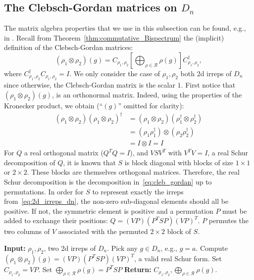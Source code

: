 \documentclass{article}
\theoremstyle{plain}
\theoremstyle{definition}
\theoremstyle{remark}
\begin{document}
\subsection{The Clebsch-Gordan matrices on $D_n$}\label{app:clebsch_gordan}
The matrix algebra properties that we use in this subsection can be found, e.g., in \citep{bhatia97}. Recall from Theorem~\ref{thm:commutative_Bispectrum} the (implicit) definition of the Clebsch-Gordan matrices:
\begin{equation}\label{eq:cleb_gordan}
    (\rho_1\otimes\rho_2)(g) = C_{\rho_1,\rho_2}\left[ \bigoplus_{\rho\in\mathcal{R}} \rho(g) \right]C_{\rho_1,\rho_2}^\dagger,
\end{equation}
where $C_{\rho_1,\rho_2}^\dagger C_{\rho_1,\rho_2}=I$.
We only consider the case of $\rho_1,\rho_2$ both 2d irreps of $D_n$ since otherwise, the Clebsch-Gordan matrix is the scalar $1$.
First notice that $(\rho_1\otimes\rho_2)(g)$, is an orthonormal matrix. Indeed, using the properties of the Kronecker product, we obtain (``$(g)$'' omitted for clarity):
\begin{align*}
    (\rho_1\otimes\rho_2)(\rho_1\otimes\rho_2)^\dagger &= (\rho_1\otimes\rho_2)(\rho_1^\dagger\otimes\rho_2^\dagger)\\
    &=(\rho_1\rho_1^\dagger)\otimes (\rho_2\rho_2^\dagger)\\
    &=I \otimes I = I
\end{align*}
For $Q$ a real orthogonal matrix ($Q^T Q = I$), and $VSV^T$ with $V^T V = I$, a real Schur decomposition of $Q$, it is known that $S$ is block diagonal with blocks of size $1\times 1$ or $2\times 2$. These blocks are themselves orthogonal matrices. Therefore, the real Schur decomposition is the decomposition in~\eqref{eq:cleb_gordan} up to permutations. In order for $S$ to represent exactly the irreps from~\eqref{eq:2d_irreps_dn}, the non-zero sub-diagonal elements should all be positive. If not, the symmetric element is positive and a permutation $P$ must be added to exchange their positions: $Q = (VP)(P^TSP)(VP)^T$. $P$ permutes the two columns of $V$ associated with the permuted $2\times 2$ block of $S$.
\begin{algorithm}
    \caption{Compute Clebsch-Gordan matrices on $D_n$}
    \begin{algorithmic}[1]
        \STATE \textbf{Input:} $\rho_1, \rho_2$, two 2d irreps of $D_n$.
        \STATE Pick any $g\in D_n$, e.g., $g = a$.
        \STATE Compute  $(\rho_1\otimes\rho_2)(g) = (VP)(P^TSP)(VP)^T$, a valid real Schur form.
        \STATE Set $C_{\rho_1,\rho_2} = VP$.
        \STATE Set $\bigoplus_{\rho\in\mathcal{R}} \rho(g) = P^TSP$
        \STATE \textbf{Return:} $C_{\rho_1,\rho_2}, \bigoplus_{\rho\in\mathcal{R}}\rho(g)$.
    \end{algorithmic}
\end{algorithm}
\end{document}
